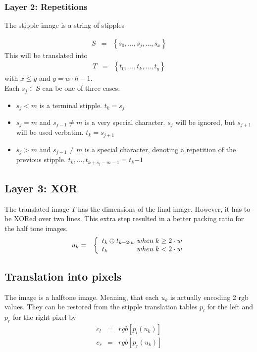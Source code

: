\documentclass[11pt,twoside,openright]{report}
\begin{document}
\subsubsection{Layer 2: Repetitions}
The stipple image is a string of stipples 

\begin{eqnarray*}
S&=&\left\{s_0,\dots,s_j,\dots,s_x\right\}
\end{eqnarray*}
This will be translated into 
\begin{eqnarray*}
T&=&\left\{t_0,\dots,t_k,\dots,t_y\right\}
\end{eqnarray*}
with $x\leq y$ and $y=w\cdot h-1$.\\

Each $s_j\in S$ can be one of three cases:
\begin{itemize}
\item{$s_j<m$ is a terminal stipple. $t_k=s_j$}
\item{$s_j=m$ and $s_{j-1}\ne m$ is a very special character. $s_j$ will be ignored, but $s_{j+1}$ will be used verbatim. $t_k=s_{j+1}$}
\item{$s_j>m$ and $s_{j-1}\ne m$ is a special character, denoting a repetition of the previous stipple. $t_{k},\dots,t_{k+s_j-m-1}=t_k{-1}$}
\end{itemize}

\subsection{Layer 3: XOR}
The translated image $T$ has the dimensions of the final image. However, it has to be XORed over two lines. This extra step resulted in a better packing ratio for the half tone images.\\
\begin{eqnarray*}
u_k&=&\left\{\begin{array}{l@{\;when\;}l}t_k \oplus t_{k-2\cdot w}&k\geq 2\cdot w\\t_k&k<2\cdot w\\\end{array}\right. %
\end{eqnarray*}
\subsection{Translation into pixels}
The image is a halftone image. Meaning, that each $u_k$ is actually encoding 2 rgb values. They can be restored from the stipple translation tables $p_l$ for the left and $p_r$ for the right pixel by
\begin{eqnarray*}
c_l&=&rgb\left[ p_l \left(u_k\right)\right]\\
c_r&=&rgb\left[ p_r \left(u_k\right)\right]\\
\end{eqnarray*}
\end{document}
